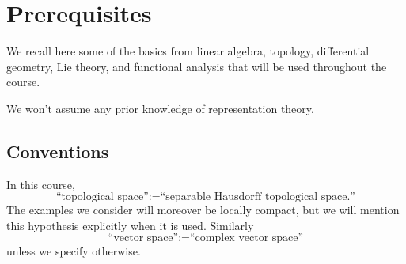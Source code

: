 \documentclass[reqno]{amsart} 
\begin{document}
  \section{Prerequisites}
  We recall here some of the basics from linear algebra, topology, differential geometry, Lie theory, and functional analysis that will be used throughout the course.

  We won't assume any prior knowledge of representation theory.

  \subsection{Conventions}
  In this course,
  \begin{equation*}
  \text{``topological space''} := \text{``separable Hausdorff topological space.''}
\end{equation*}
The examples we consider will moreover be locally compact, but we will mention this hypothesis explicitly when it is used.  Similarly
\begin{equation*}
  \text{``vector space''} := \text{``complex vector space''}
\end{equation*}
unless we specify otherwise.
\end{document}

